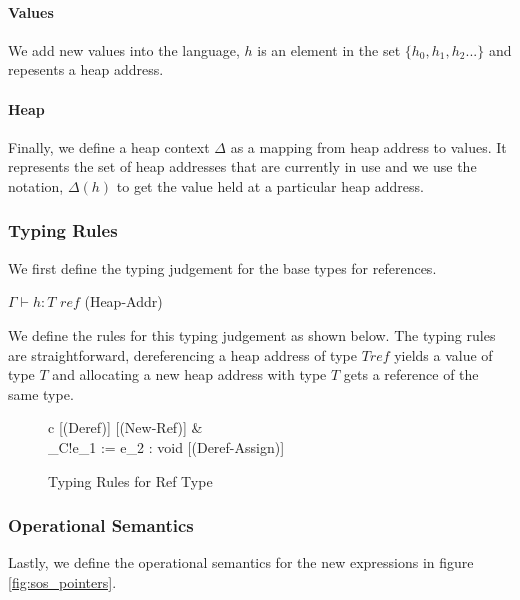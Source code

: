 \documentclass[a4paper,12pt]{report}
\begin{document}
\paragraph{Values}
We add new values into the language, $h$ is an element in the set 
$\{h_0, h_1, h_2...\}$ and repesents a heap address.

\paragraph{Heap}
Finally, we define a heap context $\Delta$ as a mapping from heap address to values.  
It represents the set of heap addresses that are currently in use and we use 
the notation, $\Delta(h)$ to get the value held at a particular heap address. 

\subsubsection{Typing Rules}
We first define the typing judgement for the base types for references. 

\begin{center}
   $\Gamma \vdash h : T\textit{ ref}$ (Heap-Addr)
\end{center}

\par
We define the rules for this typing judgement as shown below. 
The typing rules are straightforward, 
dereferencing a heap address of type $T \textit{ref}$ yields a value of type $T$ and 
allocating a new heap address with type $T$ gets a reference of the same type.

\begin{figure}[H]
  \begin{center}
    \begin{tabular} {c}
      [(Deref)]
      \text{ }
      [(New-Ref)]
      & \\
       {\Gamma \vdash_{C}\text{ }!e_1 := e_2 : void} 
      [(Deref-Assign)]
    \end{tabular}
  \end{center}
  \caption{Typing Rules for Ref Type}
\end{figure}


\subsubsection{Operational Semantics}
Lastly, we define the operational semantics for the new expressions in figure 
\ref{fig:sos_pointers}.
\end{document}
